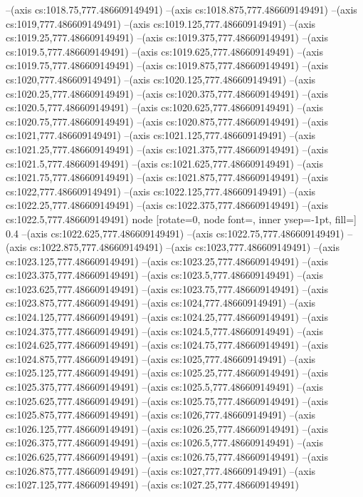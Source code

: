 --(axis cs:1018.75,777.486609149491)
--(axis cs:1018.875,777.486609149491)
--(axis cs:1019,777.486609149491)
--(axis cs:1019.125,777.486609149491)
--(axis cs:1019.25,777.486609149491)
--(axis cs:1019.375,777.486609149491)
--(axis cs:1019.5,777.486609149491)
--(axis cs:1019.625,777.486609149491)
--(axis cs:1019.75,777.486609149491)
--(axis cs:1019.875,777.486609149491)
--(axis cs:1020,777.486609149491)
--(axis cs:1020.125,777.486609149491)
--(axis cs:1020.25,777.486609149491)
--(axis cs:1020.375,777.486609149491)
--(axis cs:1020.5,777.486609149491)
--(axis cs:1020.625,777.486609149491)
--(axis cs:1020.75,777.486609149491)
--(axis cs:1020.875,777.486609149491)
--(axis cs:1021,777.486609149491)
--(axis cs:1021.125,777.486609149491)
--(axis cs:1021.25,777.486609149491)
--(axis cs:1021.375,777.486609149491)
--(axis cs:1021.5,777.486609149491)
--(axis cs:1021.625,777.486609149491)
--(axis cs:1021.75,777.486609149491)
--(axis cs:1021.875,777.486609149491)
--(axis cs:1022,777.486609149491)
--(axis cs:1022.125,777.486609149491)
--(axis cs:1022.25,777.486609149491)
--(axis cs:1022.375,777.486609149491)
--(axis cs:1022.5,777.486609149491)
node [rotate=0, node font=\tiny, inner ysep=-1pt, fill=\bgcol] {0.4}
--(axis cs:1022.625,777.486609149491)
--(axis cs:1022.75,777.486609149491)
--(axis cs:1022.875,777.486609149491)
--(axis cs:1023,777.486609149491)
--(axis cs:1023.125,777.486609149491)
--(axis cs:1023.25,777.486609149491)
--(axis cs:1023.375,777.486609149491)
--(axis cs:1023.5,777.486609149491)
--(axis cs:1023.625,777.486609149491)
--(axis cs:1023.75,777.486609149491)
--(axis cs:1023.875,777.486609149491)
--(axis cs:1024,777.486609149491)
--(axis cs:1024.125,777.486609149491)
--(axis cs:1024.25,777.486609149491)
--(axis cs:1024.375,777.486609149491)
--(axis cs:1024.5,777.486609149491)
--(axis cs:1024.625,777.486609149491)
--(axis cs:1024.75,777.486609149491)
--(axis cs:1024.875,777.486609149491)
--(axis cs:1025,777.486609149491)
--(axis cs:1025.125,777.486609149491)
--(axis cs:1025.25,777.486609149491)
--(axis cs:1025.375,777.486609149491)
--(axis cs:1025.5,777.486609149491)
--(axis cs:1025.625,777.486609149491)
--(axis cs:1025.75,777.486609149491)
--(axis cs:1025.875,777.486609149491)
--(axis cs:1026,777.486609149491)
--(axis cs:1026.125,777.486609149491)
--(axis cs:1026.25,777.486609149491)
--(axis cs:1026.375,777.486609149491)
--(axis cs:1026.5,777.486609149491)
--(axis cs:1026.625,777.486609149491)
--(axis cs:1026.75,777.486609149491)
--(axis cs:1026.875,777.486609149491)
--(axis cs:1027,777.486609149491)
--(axis cs:1027.125,777.486609149491)
--(axis cs:1027.25,777.486609149491)
